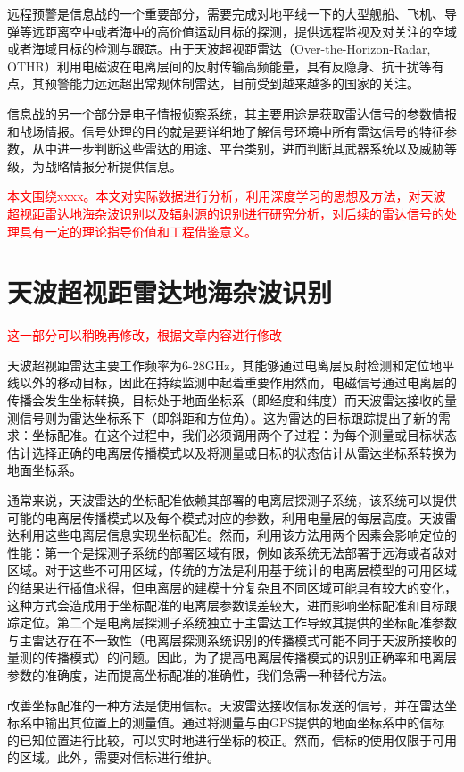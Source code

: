远程预警是信息战的一个重要部分，需要完成对地平线一下的大型舰船、飞机、导弹等远距离空中或者海中的高价值运动目标的探测，提供远程监视及对关注的空域或者海域目标的检测与跟踪。由于天波超视距雷达（Over-the-Horizon-Radar, OTHR）利用电磁波在电离层间的反射传输高频能量，具有反隐身、抗干扰等有点，其预警能力远远超出常规体制雷达，目前受到越来越多的国家的关注。

信息战的另一个部分是电子情报侦察系统，其主要用途是获取雷达信号的参数情报和战场情报。信号处理的目的就是要详细地了解信号环境中所有雷达信号的特征参数，从中进一步判断这些雷达的用途、平台类别，进而判断其武器系统以及威胁等级，为战略情报分析提供信息。

\textcolor{red}{本文围绕xxxx。本文对实际数据进行分析，利用深度学习的思想及方法，对天波超视距雷达地海杂波识别以及辐射源的识别进行研究分析，对后续的雷达信号的处理具有一定的理论指导价值和工程借鉴意义。}
\section{天波超视距雷达地海杂波识别}
\textcolor{red}{这一部分可以稍晚再修改，根据文章内容进行修改}

天波超视距雷达主要工作频率为6-28GHz，其能够通过电离层反射检测和定位地平线以外的移动目标，因此在持续监测中起着重要作用\cite{headrick1974over, fabrizio2013high}然而，电磁信号通过电离层的传播会发生坐标转换，目标处于地面坐标系（即经度和纬度）而天波雷达接收的量测信号则为雷达坐标系下（即斜距和方位角）\cite{krolik1997maximum}。这为雷达的目标跟踪提出了新的需求：坐标配准。在这个过程中，我们必须调用两个子过程：为每个测量或目标状态估计选择正确的电离层传播模式以及将测量或目标的状态估计从雷达坐标系转换为地面坐标系。

通常来说，天波雷达的坐标配准依赖其部署的电离层探测子系统，该系统可以提供可能的电离层传播模式以及每个模式对应的参数，利用电量层的每层高度\cite{wheadon1994ionospheric}。天波雷达利用这些电离层信息实现坐标配准。然而，利用该方法用两个因素会影响定位的性能：第一个是探测子系统的部署区域有限，例如该系统无法部署于远海或者敌对区域。对于这些不可用区域，传统的方法是利用基于统计的电离层模型的可用区域的结果进行插值求得，但电离层的建模十分复杂且不同区域可能具有较大的变化，这种方式会造成用于坐标配准的电离层参数误差较大，进而影响坐标配准和目标跟踪定位。第二个是电离层探测子系统独立于主雷达工作导致其提供的坐标配准参数与主雷达存在不一致性（电离层探测系统识别的传播模式可能不同于天波所接收的量测的传播模式）的问题。因此，为了提高电离层传播模式的识别正确率和电离层参数的准确度，进而提高坐标配准的准确性，我们急需一种替代方法。

改善坐标配准的一种方法是使用信标\cite{weijers1995oth}。天波雷达接收信标发送的信号，并在雷达坐标系中输出其位置上的测量值。通过将测量与由GPS提供的地面坐标系中的信标的已知位置进行比较，可以实时地进行坐标的校正。然而，信标的使用仅限于可用的区域。此外，需要对信标进行维护。


